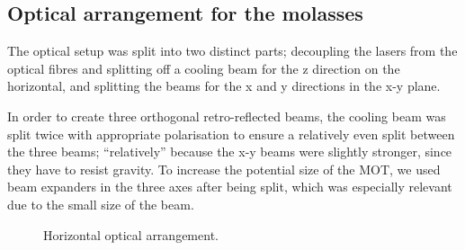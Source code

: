 \documentclass[11pt,twoside,a4paper]{article}
\begin{document}
\subsection{Optical arrangement for the molasses}
The optical setup was split into two distinct parts; decoupling the lasers from the optical fibres and splitting off a cooling beam for the z direction on the horizontal, and splitting the beams for the
x and y directions in the x-y plane.

In order to create three orthogonal retro-reflected beams, the cooling beam was split twice with appropriate polarisation to ensure a relatively even split between the three beams; ``relatively'' because
the x-y beams were slightly stronger, since they have to resist gravity. To increase the potential size of the MOT, we used beam expanders in the three axes after being split, which was especially relevant
due to the small size of the beam.
\begin{figure}[h]
    \centering
    \caption{Horizontal optical arrangement.}
\end{figure}
\end{document}
